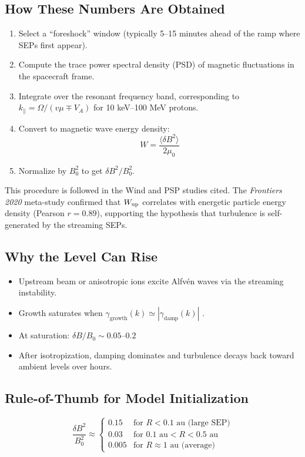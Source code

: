 \subsection*{How These Numbers Are Obtained}
\begin{enumerate}
    \item Select a ``foreshock'' window (typically 5–15 minutes ahead of the ramp where SEPs first appear).
    \item Compute the trace power spectral density (PSD) of magnetic fluctuations in the spacecraft frame.
    \item Integrate over the resonant frequency band, corresponding to $k_\parallel = \Omega / (v\mu \mp V_A)$ for 10 keV–100 MeV protons.
    \item Convert to magnetic wave energy density:
    \[
    W = \frac{\langle \delta B^2 \rangle}{2\mu_0}
    \]
    \item Normalize by $B_0^2$ to get $\delta B^2 / B_0^2$.
\end{enumerate}

This procedure is followed in the Wind and PSP studies cited. The \textit{Frontiers 2020} meta-study confirmed that $W_{\rm up}$ correlates with energetic particle energy density (Pearson $r = 0.89$), supporting the hypothesis that turbulence is self-generated by the streaming SEPs.

\subsection*{Why the Level Can Rise}
\begin{itemize}
    \item Upstream beam or anisotropic ions excite Alfvén waves via the streaming instability.
    \item Growth saturates when $\gamma_{\text{growth}}(k) \simeq |\gamma_{\text{damp}}(k)|$ \cite{skilling1975, lee2005}.
    \item At saturation: $\delta B / B_0 \sim 0.05\text{–}0.2$
    \item After isotropization, damping dominates and turbulence decays back toward ambient levels over hours.
\end{itemize}

\subsection*{Rule-of-Thumb for Model Initialization}
\[
\frac{\delta B^2}{B_0^2} \approx
\begin{cases}
0.15 & \text{for } R < 0.1 \text{ au (large SEP)} \\
0.03 & \text{for } 0.1 \text{ au} < R < 0.5 \text{ au} \\
0.005 & \text{for } R \approx 1 \text{ au (average)}
\end{cases}
\]

